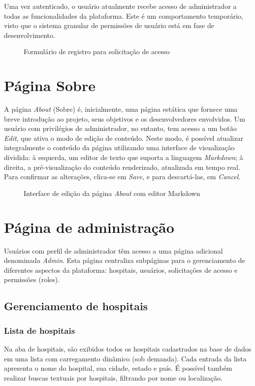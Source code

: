 \documentclass{article}
\newcommand{\image}[2]{
    \begin{figure}[H]
        \fcolorbox{light-gray}{white}{\texttt{[image: \#1]}}
        \caption{#2}
    \end{figure}
}
\begin{document}
Uma vez autenticado, o usuário atualmente recebe acesso de administrador a todas as funcionalidades da plataforma. Este é um comportamento temporário, visto que o sistema granular de permissões de usuário está em fase de desenvolvimento.

\image{03.png}{Formulário de registro para solicitação de acesso}

\section{Página Sobre}

A página \textit{About} (Sobre) é, inicialmente, uma página estática que fornece uma breve introdução ao projeto, seus objetivos e os desenvolvedores envolvidos. Um usuário com privilégios de administrador, no entanto, tem acesso a um botão \textit{Edit}, que ativa o modo de edição de conteúdo. Neste modo, é possível atualizar integralmente o conteúdo da página utilizando uma interface de visualização dividida: à esquerda, um editor de texto que suporta a linguagem \textit{Markdown}; à direita, a pré-visualização do conteúdo renderizado, atualizada em tempo real. Para confirmar as alterações, clica-se em \textit{Save}, e para descartá-las, em \textit{Cancel}.

\image{04.png}{Interface de edição da página \textit{About} com editor Markdown}

\section{Página de administração}

Usuários com perfil de administrador têm acesso a uma página adicional denominada \textit{Admin}. Esta página centraliza subpáginas para o gerenciamento de diferentes aspectos da plataforma: hospitais, usuários, solicitações de acesso e permissões (roles).

\subsection{Gerenciamento de hospitais}

\subsubsection{Lista de hospitais}

Na aba de hospitais, são exibidos todos os hospitais cadastrados na base de dados em uma lista com carregamento dinâmico (sob demanda). Cada entrada da lista apresenta o nome do hospital, sua cidade, estado e país. É possível também realizar buscas textuais por hospitais, filtrando por nome ou localização.
\end{document}
